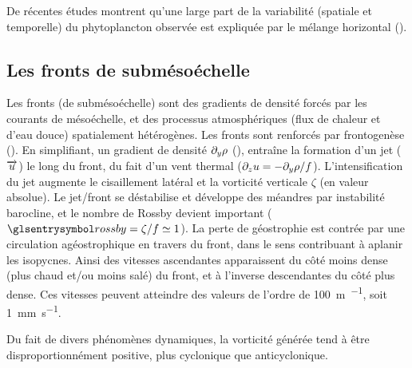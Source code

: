 De récentes études montrent qu'une large part de la variabilité (spatiale et temporelle) du phytoplancton observée est expliquée par le mélange horizontal (\cite{glover_2018,keerthi_2022,jonsson_2023}).



\subsection{Les fronts de submésoéchelle}

Les fronts (de submésoéchelle) sont des gradients de densité forcés par les courants de mésoéchelle, et des processus atmosphériques (flux de chaleur et d'eau douce) spatialement hétérogènes.
Les fronts sont renforcés par frontogenèse (\cite{thomas_2008,mcwilliams_2016}).
En simplifiant, un gradient de densité \(\textder{\rho}{y}\) (), entraîne la formation d'un jet (\(\vect{u}\)) le long du front, du fait d'un vent thermal (\(\textder{u}{z} = -\textder{\rho}{y} / f\)).
L'intensification du jet augmente le cisaillement latéral et la vorticité verticale \(\zeta\) (en valeur absolue).
Le jet/front se déstabilise et développe des méandres par instabilité barocline, et le nombre de Rossby devient important (\(\am{rossby} = \zeta / f \simeq 1\)).
La perte de géostrophie est contrée par une circulation agéostrophique en travers du front, dans le sens contribuant à aplanir les isopycnes.
Ainsi des vitesses ascendantes apparaissent du côté moins dense (plus chaud et/ou moins salé) du front, et à l'inverse descendantes du côté plus dense.
Ces vitesses peuvent atteindre des valeurs de l'ordre de \qty{100}{\meter\per\jr}, soit \qty{1}{\mm\per\s}.

\begin{note}
  Du fait de divers phénomènes dynamiques, la vorticité générée tend à être disproportionnément positive,  plus cyclonique que anticyclonique.
\end{note}

\begin{figure}
  \centering
  \label{fig:frontogenesis}
\end{figure}

